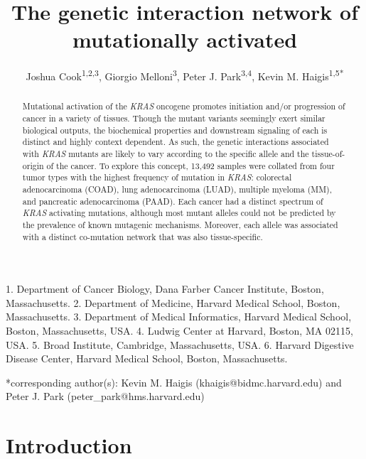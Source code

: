 \documentclass[english, 12pt, letterpaper]{article}
\title{The genetic interaction network of mutationally activated \KRAS{}}
\author{
    Joshua Cook\textsuperscript{1,2,3},
    Giorgio Melloni\textsuperscript{3}, 
    Peter J. Park\textsuperscript{3,4}, 
    Kevin M. Haigis\textsuperscript{1,5{*}}
}
\newcommand{\KRAS}{\emph{KRAS}}
\begin{document}
\maketitle

\thispagestyle{fancy}

1. Department of Cancer Biology, Dana Farber Cancer Institute, Boston, Massachusetts.
2. Department of Medicine, Harvard Medical School, Boston, Massachusetts.
3. Department of Medical Informatics, Harvard Medical School, Boston, Massachusetts, USA.
4. Ludwig Center at Harvard, Boston, MA 02115, USA.
5. Broad Institute, Cambridge, Massachusetts, USA.
6. Harvard Digestive Disease Center, Harvard Medical School, Boston, Massachusetts.

{*}corresponding author(s):
Kevin M. Haigis (khaigis@bidmc.harvard.edu) and Peter J. Park (peter\_park@hms.harvard.edu)

\begin{abstract}
Mutational activation of the  \KRAS{} oncogene promotes initiation and/or progression of cancer in a variety of tissues.
Though the mutant variants seemingly exert similar biological outputs, the biochemical properties and downstream signaling  of each is distinct and highly context dependent.
As such, the genetic interactions associated with \KRAS{} mutants are likely to vary according to the specific allele and the tissue-of-origin of the cancer.
To explore this concept, 13,492 samples were collated from four tumor types with the highest frequency of mutation in \KRAS{}: colorectal adenocarcinoma (COAD), lung adenocarcinoma (LUAD), multiple myeloma (MM), and pancreatic adenocarcinoma (PAAD).
Each cancer had a distinct spectrum of \KRAS{} activating mutations, although most mutant alleles could not be predicted by the prevalence of known mutagenic mechanisms.
Moreover, each allele was associated with a distinct co-mutation network that was also tissue-specific.
 
\end{abstract}



\section*{Introduction}
\end{document}
